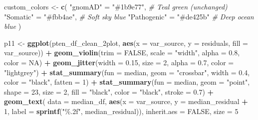 \documentclass[
]{article}
\newenvironment{Shaded}{\begin{snugshade}}{\end{snugshade}}
\newcommand{\AttributeTok}[1]{\textcolor[rgb]{0.13,0.29,0.53}{#1}}
\newcommand{\CommentTok}[1]{\textcolor[rgb]{0.56,0.35,0.01}{\textit{#1}}}
\newcommand{\ConstantTok}[1]{\textcolor[rgb]{0.56,0.35,0.01}{#1}}
\newcommand{\DecValTok}[1]{\textcolor[rgb]{0.00,0.00,0.81}{#1}}
\newcommand{\FloatTok}[1]{\textcolor[rgb]{0.00,0.00,0.81}{#1}}
\newcommand{\FunctionTok}[1]{\textcolor[rgb]{0.13,0.29,0.53}{\textbf{#1}}}
\newcommand{\NormalTok}[1]{#1}
\newcommand{\OtherTok}[1]{\textcolor[rgb]{0.56,0.35,0.01}{#1}}
\newcommand{\SpecialCharTok}[1]{\textcolor[rgb]{0.81,0.36,0.00}{\textbf{#1}}}
\newcommand{\StringTok}[1]{\textcolor[rgb]{0.31,0.60,0.02}{#1}}
\begin{document}
\begin{Shaded}
\begin{Highlighting}[]
\NormalTok{custom\_colors }\OtherTok{\textless{}{-}} \FunctionTok{c}\NormalTok{(}
  \StringTok{"gnomAD"}     \OtherTok{=} \StringTok{"\#1b9e77"}\NormalTok{,  }\CommentTok{\# Teal green (unchanged)}
  \StringTok{"Somatic"}    \OtherTok{=} \StringTok{"\#fbb4ae"}\NormalTok{,  }\CommentTok{\# Soft sky blue}
  \StringTok{"Pathogenic"} \OtherTok{=} \StringTok{"\#de425b"}   \CommentTok{\# Deep ocean blue}
\NormalTok{)}


\NormalTok{p11 }\OtherTok{\textless{}{-}} \FunctionTok{ggplot}\NormalTok{(pten\_df\_clean\_2plot, }\FunctionTok{aes}\NormalTok{(}\AttributeTok{x =}\NormalTok{ var\_source, }\AttributeTok{y =}\NormalTok{ residuals, }\AttributeTok{fill =}\NormalTok{ var\_source)) }\SpecialCharTok{+}
  \FunctionTok{geom\_violin}\NormalTok{(}\AttributeTok{trim =} \ConstantTok{FALSE}\NormalTok{, }\AttributeTok{scale =} \StringTok{"width"}\NormalTok{, }\AttributeTok{alpha =} \FloatTok{0.8}\NormalTok{, }\AttributeTok{color =} \ConstantTok{NA}\NormalTok{) }\SpecialCharTok{+}
  \FunctionTok{geom\_jitter}\NormalTok{(}\AttributeTok{width =} \FloatTok{0.15}\NormalTok{, }\AttributeTok{size =} \DecValTok{2}\NormalTok{, }\AttributeTok{alpha =} \FloatTok{0.7}\NormalTok{, }\AttributeTok{color =} \StringTok{"lightgrey"}\NormalTok{) }\SpecialCharTok{+}
  \FunctionTok{stat\_summary}\NormalTok{(}\AttributeTok{fun =}\NormalTok{ median, }\AttributeTok{geom =} \StringTok{"crossbar"}\NormalTok{, }\AttributeTok{width =} \FloatTok{0.4}\NormalTok{, }\AttributeTok{color =} \StringTok{"black"}\NormalTok{, }\AttributeTok{fatten =} \DecValTok{1}\NormalTok{) }\SpecialCharTok{+}
  \FunctionTok{stat\_summary}\NormalTok{(}\AttributeTok{fun =}\NormalTok{ median, }\AttributeTok{geom =} \StringTok{"point"}\NormalTok{, }\AttributeTok{shape =} \DecValTok{23}\NormalTok{, }\AttributeTok{size =} \DecValTok{2}\NormalTok{, }\AttributeTok{fill =} \StringTok{"black"}\NormalTok{, }\AttributeTok{color =} \StringTok{"black"}\NormalTok{, }\AttributeTok{stroke =} \FloatTok{0.7}\NormalTok{) }\SpecialCharTok{+}
  \FunctionTok{geom\_text}\NormalTok{(}
    \AttributeTok{data =}\NormalTok{ median\_df,}
    \FunctionTok{aes}\NormalTok{(}\AttributeTok{x =}\NormalTok{ var\_source, }\AttributeTok{y =}\NormalTok{ median\_residual }\SpecialCharTok{+} \DecValTok{1}\NormalTok{, }\AttributeTok{label =} \FunctionTok{sprintf}\NormalTok{(}\StringTok{"\%.2f"}\NormalTok{, median\_residual)),}
    \AttributeTok{inherit.aes =} \ConstantTok{FALSE}\NormalTok{,}
    \AttributeTok{size =} \DecValTok{5}

\end{Highlighting}
\end{Shaded}
\end{document}

